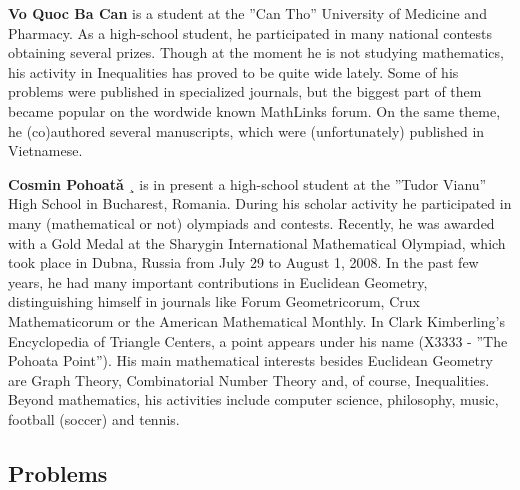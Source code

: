 \documentclass{article}
\begin{document}
\textbf{Vo Quoc Ba Can} is a student at the ”Can Tho” University of Medicine and Pharmacy. As a high-school student, he participated in many national contests obtaining several prizes. Though at the moment he is not studying mathematics, his activity in Inequalities has proved to be quite wide lately. Some of his problems were published in specialized journals, but the biggest part of them became popular on the wordwide known MathLinks forum. On the same theme, he (co)authored several manuscripts, which were (unfortunately) published in Vietnamese.\par
\textbf{Cosmin Pohoat\v{a}} ¸ is in present a high-school student at the ”Tudor Vianu” High School in Bucharest, Romania. During his scholar activity he participated in many (mathematical or not) olympiads and contests. Recently, he was awarded with a Gold Medal at the Sharygin International Mathematical Olympiad, which took place in Dubna, Russia from July 29 to August 1, 2008. In the past few years, he had many important contributions in Euclidean Geometry, distinguishing himself in journals like Forum Geometricorum, Crux Mathematicorum or the American Mathematical Monthly. In Clark Kimberling’s Encyclopedia of Triangle Centers, a point appears under his name (X3333 - ”The Pohoata Point”). His main mathematical interests besides Euclidean Geometry are Graph Theory, Combinatorial Number Theory and, of course, Inequalities. Beyond mathematics, his activities include computer science, philosophy, music, football (soccer) and tennis.


	










\pagebreak

















\setcounter{page}{1}












	
\begin{center}
	\section*{Problems}
\end{center}
\end{document}
